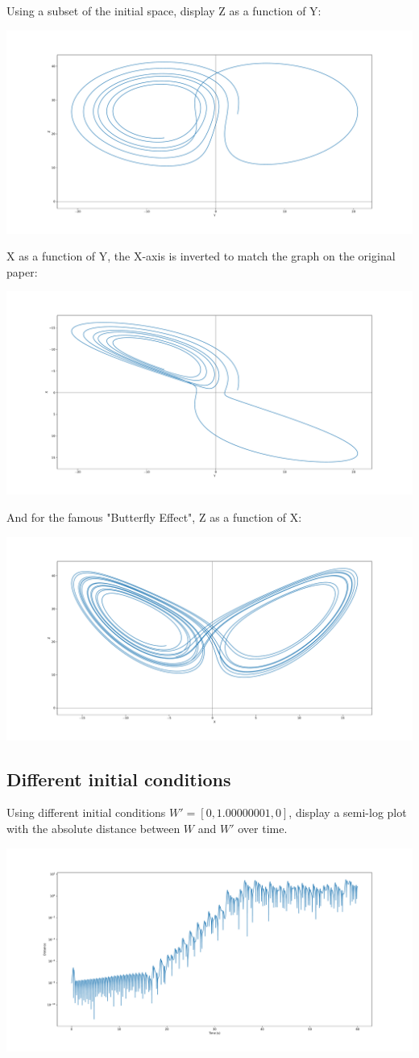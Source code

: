 \documentclass{article}
\begin{document}
Using a subset of the initial space, display Z as a function of Y:

\includegraphics[scale=0.2]{lorenz_4.pdf}

X as a function of Y, the X-axis is inverted to match the graph on the original paper:

\includegraphics[scale=0.2]{lorenz_5.pdf}

And for the famous "Butterfly Effect", Z as a function of X:

\includegraphics[scale=0.2]{lorenz_6.pdf}

\subsection{Different initial conditions}

Using different initial conditions $W' = [0, 1.00000001, 0]$, display a semi-log plot with the absolute distance between $W$ and $W'$ over time.

\includegraphics[scale=0.2]{lorenz_7.pdf}
\end{document}
